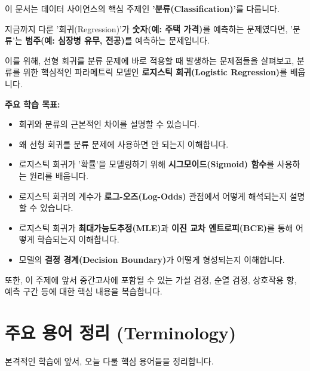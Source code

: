 \documentclass[11pt,a4paper]{book}
\theoremstyle{definition}
\begin{document}
\begin{summarybox}
이 문서는 데이터 사이언스의 핵심 주제인 \textbf{'분류(Classification)'}를 다룹니다.

지금까지 다룬 '회귀(Regression)'가 \textbf{숫자(예: 주택 가격)}를 예측하는 문제였다면,
'분류'는 \textbf{범주(예: 심장병 유무, 전공)}를 예측하는 문제입니다.

이를 위해, 선형 회귀를 분류 문제에 바로 적용할 때 발생하는 문제점들을 살펴보고,
분류를 위한 핵심적인 파라메트릭 모델인 \textbf{로지스틱 회귀(Logistic Regression)}를 배웁니다.

\medskip
\textbf{주요 학습 목표:}
\begin{itemize}
    \item 회귀와 분류의 근본적인 차이를 설명할 수 있습니다.
    \item 왜 선형 회귀를 분류 문제에 사용하면 안 되는지 이해합니다.
    \item 로지스틱 회귀가 '확률'을 모델링하기 위해 \textbf{시그모이드(Sigmoid) 함수}를 사용하는 원리를 배웁니다.
    \item 로지스틱 회귀의 계수가 \textbf{로그-오즈(Log-Odds)} 관점에서 어떻게 해석되는지 설명할 수 있습니다.
    \item 로지스틱 회귀가 \textbf{최대가능도추정(MLE)}과 \textbf{이진 교차 엔트로피(BCE)}를 통해 어떻게 학습되는지 이해합니다.
    \item 모델의 \textbf{결정 경계(Decision Boundary)}가 어떻게 형성되는지 이해합니다.
\end{itemize}
또한, 이 주제에 앞서 중간고사에 포함될 수 있는 가설 검정, 순열 검정, 상호작용 항, 예측 구간 등에 대한 핵심 내용을 복습합니다.
\end{summarybox}


\section*{주요 용어 정리 (Terminology)}

본격적인 학습에 앞서, 오늘 다룰 핵심 용어들을 정리합니다.
\end{document}
